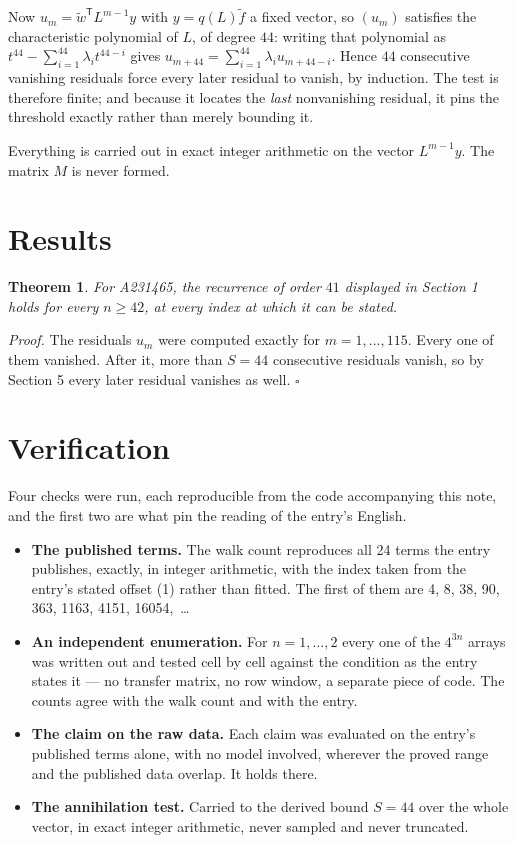 \documentclass[11pt]{article}
\newtheorem{theorem}{Theorem}
\theoremstyle{definition}
\begin{document}
Now $u_m = \tilde w^{\mathsf T} L^{m-1} y$ with $y = q(L)\tilde f$ a fixed vector, so $(u_m)$ satisfies the characteristic polynomial of $L$, of degree $44$: writing that polynomial as $t^{44} - \sum_{i=1}^{44} \lambda_i t^{44-i}$ gives $u_{m+44} = \sum_{i=1}^{44} \lambda_i u_{m+44-i}$. Hence $44$ consecutive vanishing residuals force every later residual to vanish, by induction. The test is therefore finite; and because it locates the {\itshape last} nonvanishing residual, it pins the threshold exactly rather than merely bounding it.

Everything is carried out in exact integer arithmetic on the vector $L^{m-1}y$. The matrix $M$ is never formed.

\section{Results}

\begin{theorem} For A231465, the recurrence of order $41$ displayed in Section 1 holds for every $n \ge 42$, at every index at which it can be stated.\end{theorem}

{\itshape Proof.} The residuals $u_m$ were computed exactly for $m = 1,\dots,115$. Every one of them vanished. After it, more than $S = 44$ consecutive residuals vanish, so by Section 5 every later residual vanishes as well. $\square$

\section{Verification}

Four checks were run, each reproducible from the code accompanying this note, and the first two are what pin the reading of the entry's English.

\begin{itemize}

\item {\bfseries The published terms.} The walk count reproduces all 24 terms the entry publishes, exactly, in integer arithmetic, with the index taken from the entry's stated offset (1) rather than fitted. The first of them are 4, 8, 38, 90, 363, 1163, 4151, 16054,~\dots

\item {\bfseries An independent enumeration.} For $n = 1,\dots,2$ every one of the $4^{3n}$ arrays was written out and tested cell by cell against the condition as the entry states it --- no transfer matrix, no row window, a separate piece of code. The counts agree with the walk count and with the entry.

\item {\bfseries The claim on the raw data.} Each claim was evaluated on the entry's published terms alone, with no model involved, wherever the proved range and the published data overlap. It holds there.

\item {\bfseries The annihilation test.} Carried to the derived bound $S = 44$ over the whole vector, in exact integer arithmetic, never sampled and never truncated.

\end{itemize}
\end{document}
